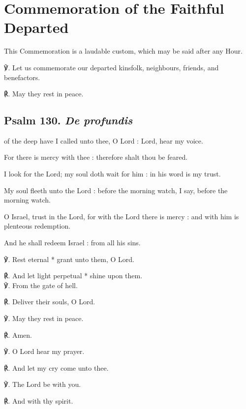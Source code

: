 \section{Commemoration of the Faithful Departed}
\fancyhead[RE,LO]{}
\begin{secrubric}
    This Commemoration is a laudable custom, which may be said after any Hour.
\end{secrubric}
\begin{multicols}{2}
℣. Let us commemorate our departed kinsfolk, neighbours, friends, and benefactors.

℟. May they rest in peace.

\subsection{Psalm 130. \textit{De profundis}}

 of the deep have I called unto thee, O Lord : Lord, hear my voice.\par
{}
For there is mercy with thee : therefore shalt thou be feared.\par
{}I look for the Lord; my soul doth wait for him : in his word is my trust.\par
{}My soul fleeth unto the Lord : before the morning watch, I say, before the morning watch.\par
{}O Israel, trust in the Lord, for with the Lord there is mercy : and with him is plenteous redemption.\par
{}And he shall redeem Israel : from all his sins.\par
℣. Rest eternal * grant unto them, O Lord.\par
℟. And let light perpetual * shine upon them.\\

℣. From the gate of hell.\par
℟. Deliver their souls, O Lord.

℣. May they rest in peace.\par
℟. Amen.

℣. O Lord hear my prayer.\par
℟. And let my cry come unto thee.\par
℣. The Lord be with you.\par
℟. And with thy spirit.\\


\end{multicols}
